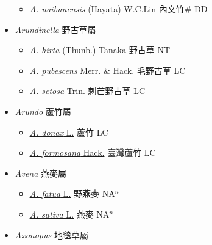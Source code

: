 \begin{itemize}
  \begin{itemize}
        \item[] \href{http://www.theplantlist.org/tpl1.1/search?q=Arthrostylidium+naibunensis}{\textit{A. naibunensis} (Hayata) W.C.Lin}   內文竹\# DD
  \end{itemize}
 \item[] \textit{Arundinella} 野古草屬
                    
  \begin{itemize}
        \item[] \href{http://www.theplantlist.org/tpl1.1/search?q=Arundinella+hirta}{\textit{A. hirta} (Thunb.) Tanaka}   野古草 NT
        \item[] \href{http://www.theplantlist.org/tpl1.1/search?q=Arundinella+pubescens}{\textit{A. pubescens} Merr. \& Hack.}   毛野古草 LC
        \item[] \href{http://www.theplantlist.org/tpl1.1/search?q=Arundinella+setosa}{\textit{A. setosa} Trin.}   刺芒野古草 LC
  \end{itemize}
 \item[] \textit{Arundo} 蘆竹屬
                    
  \begin{itemize}
        \item[] \href{http://www.theplantlist.org/tpl1.1/search?q=Arundo+donax}{\textit{A. donax} L.}   蘆竹 LC
        \item[] \href{http://www.theplantlist.org/tpl1.1/search?q=Arundo+formosana}{\textit{A. formosana} Hack.}   臺灣蘆竹 LC
  \end{itemize}
 \item[] \textit{Avena} 燕麥屬
                    
  \begin{itemize}
        \item[] \href{http://www.theplantlist.org/tpl1.1/search?q=Avena+fatua}{\textit{A. fatua} L.}   野燕麥 NA$^n$
        \item[] \href{http://www.theplantlist.org/tpl1.1/search?q=Avena+sativa}{\textit{A. sativa} L.}   燕麥 NA$^n$
  \end{itemize}
 \item[] \textit{Axonopus} 地毯草屬
                    

\end{itemize}

